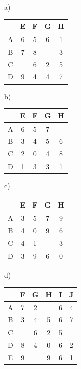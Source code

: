 \vspace{-10pt}\begin{minipage}[t]{0.25\textwidth}
a)\vspace{2pt}

\begin{tabular}{c|cccc}
 & E & F & G & H \\
\hline
A & 6 & 5 & 6 & 1 \\
B & 7 & 8 &   & 3 \\
C &   & 6 & 2 & 5 \\
D & 9 & 4 & 4 & 7 \\
\end{tabular}
\end{minipage}%
\begin{minipage}[t]{0.25\textwidth}
b)\vspace{2pt}

\begin{tabular}{c|cccc}
 & E & F & G & H \\
\hline
A & 6 & 5 & 7 &   \\
B & 3 & 4 & 5 & 6 \\
C & 2 & 0 & 4 & 8 \\
D & 1 & 3 & 3 & 1 \\
\end{tabular}
\hfill
\end{minipage}%
\begin{minipage}[t]{0.25\textwidth}
c)\vspace{2pt}

\begin{tabular}{c|cccc}
 & E & F & G & H \\
\hline
A & 3 & 5 & 7 & 9 \\
B & 4 & 0 & 9 & 6 \\
C & 4 & 1 &   & 3 \\
D & 3 & 9 & 6 & 0 \\
\end{tabular}
\end{minipage}
\begin{minipage}[t]{0.25\textwidth}
d)\vspace{2pt}

\begin{tabular}{c|ccccc}
 & F & G & H & I & J \\
\hline
A & 7 & 2 &   & 6 & 4 \\
B & 3 & 4 & 5 & 6 & 7 \\
C &   & 6 & 2 & 5 &   \\
D & 8 & 4 & 0 & 6 & 2 \\
E & 9 &   & 9 & 6 & 1 \\
\end{tabular}
\end{minipage}


